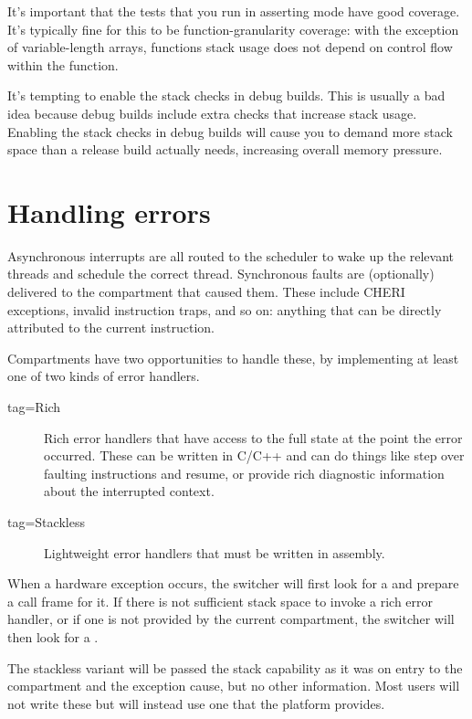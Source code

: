 It's important that the tests that you run in asserting mode have good coverage.
It's typically fine for this to be function-granularity coverage: with the exception of variable-length arrays, functions stack usage does not depend on control flow within the function.

\begin{caution}
It's tempting to enable the stack checks in debug builds.
This is usually a bad idea because debug builds include extra checks that increase stack usage.
Enabling the stack checks in debug builds will cause you to demand more stack space than a release build actually needs, increasing overall memory pressure.
\end{caution}

\section[label=handling_errors]{Handling errors}

Asynchronous interrupts are all routed to the scheduler to wake up the relevant threads and schedule the correct thread.
Synchronous faults are (optionally) delivered to the compartment that caused them.
These include CHERI exceptions, invalid instruction traps, and so on: anything that can be directly attributed to the current instruction.

Compartments have two opportunities to handle these, by implementing at least one of two kinds of error handlers.

\begin{description}
	\item[tag=Rich]{Rich error handlers that have access to the full state at the point the error occurred.
		These can be written in C/C++ and can do things like step over faulting instructions and resume, or provide rich diagnostic information about the interrupted context.}
	\item[tag=Stackless]{Lightweight error handlers that must be written in assembly.}
\end{description}

When a hardware exception occurs, the switcher will first look for a  and prepare a call frame for it.
If there is not sufficient stack space to invoke a rich error handler, or if one is not provided by the current compartment, the switcher will then look for a .

The stackless variant will be passed the stack capability as it was on entry to the compartment and the exception cause, but no other information.
Most users will not write these but will instead use one that the platform provides.

